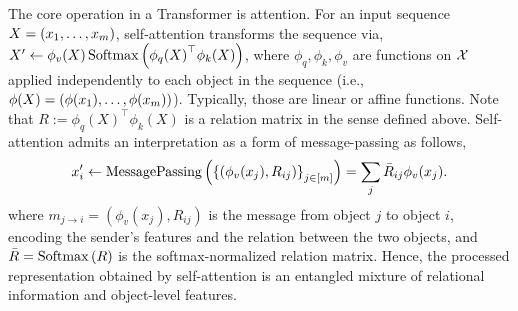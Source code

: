 The core operation in a Transformer is attention. For an input sequence $X = \left(x_1, \ldots, x_m\right)$, self-attention transforms the sequence via, $ X' \gets \phi_v(X) \, \mathrm{Softmax}\left({\phi_q(X)}^\top \phi_k(X)\right)$,
where $\phi_q, \phi_k, \phi_v$ are functions on ${\mathcal{X}}$ applied independently to each object in the sequence (i.e., $\phi(X) = \left(\phi(x_1), \ldots, \phi(x_m)\right)$). Typically, those are linear or affine functions.
Note that $R := \phi_q(X)^\top \phi_k(X)$ is a relation matrix in the sense defined above. Self-attention admits an interpretation as a form of message-passing as follows, 
\begin{equation}\label{eq:self_attn_message_passing}
    x_i' \gets \mathrm{MessagePassing}\left(\left\{(\phi_v(x_j), R_{ij})\right\}_{j \in [m]}\right) = \sum_{j} \bar{R}_{ij} \phi_v(x_j).
\end{equation}
where $m_{j \to i} = (\phi_v(x_j), R_{ij})$ is the message from object $j$ to object $i$, encoding the sender's features and the relation between the two objects, and $\bar{R} = \mathrm{Softmax}\left(R\right)$ is the softmax-normalized relation matrix. Hence, the processed representation obtained by self-attention is an entangled mixture of relational information and object-level features.

